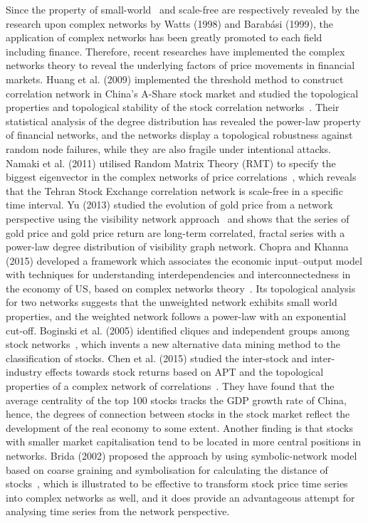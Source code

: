 Since the property of small-world~\cite{watts1998collective} and scale-free \cite{barabasi1999emergence} are respectively revealed by the research upon complex networks by Watts (1998) and Barab{\'a}si (1999), the application of complex networks has been greatly promoted to each field including finance. Therefore, recent researches have implemented the complex networks theory to reveal the underlying factors of price movements in financial markets. Huang et al. (2009) implemented the threshold method to construct correlation network in China's A-Share stock market and studied the topological properties and topological stability of the stock correlation networks~\cite{chinesenetwork}. Their statistical analysis of the degree distribution has revealed the power-law property of financial networks, and the networks display a topological robustness against random node failures, while they are also fragile under intentional attacks. Namaki et al. (2011) utilised Random Matrix Theory (RMT) to specify the biggest eigenvector in the complex networks of price correlations~\cite{genuine}, which reveals that the Tehran Stock Exchange correlation network is scale-free in a specific time interval. Yu (2013) studied the evolution of gold price from a network perspective using the visibility network approach~\cite{visibility} and shows that the series of gold price and gold price return are long-term correlated, fractal series with a power-law degree distribution of visibility graph network. Chopra and Khanna (2015) developed a framework which associates the economic input–output model with techniques for understanding interdependencies and interconnectedness in the economy of US, based on complex networks theory~\cite{intercd}. Its topological analysis for two networks suggests that the unweighted network exhibits small world properties, and the weighted network follows a power-law with an exponential cut-off. Boginski et al. (2005) identified cliques and independent groups among stock networks~\cite{statisticalanalysis}, which  invents a new alternative data mining method to the classification of stocks. Chen et al. (2015) studied the inter-stock and inter-industry effects towards stock returns based on APT and the topological properties of a complex network of correlations~\cite{CHEN2015224}. They have found that the average centrality of the top 100 stocks tracks the GDP growth rate of China, hence, the degrees of connection between stocks in the stock market reflect the development of the real economy to some extent. Another finding is that stocks with smaller market capitalisation tend to be located in more central positions in networks. Brida (2002) proposed the approach by using symbolic-network model based on coarse graining and symbolisation for calculating the distance of stocks~\cite{brida2002high}, which is illustrated to be effective to transform stock price time series into complex networks as well, and it does provide an advantageous attempt for analysing time series from the network perspective.

